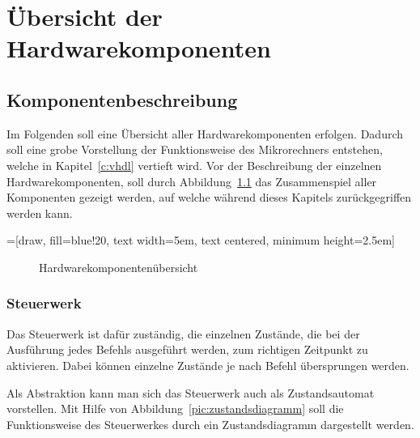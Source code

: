 \chapter{Übersicht der Hardwarekomponenten}
\label{c:hardware}
\section{Komponentenbeschreibung}
Im Folgenden soll eine Übersicht aller Hardwarekomponenten erfolgen. Dadurch
soll eine grobe Vorstellung der Funktionsweise des Mikrorechners entstehen,
welche in Kapitel~\ref{c:vhdl} vertieft wird. Vor der Beschreibung der einzelnen
Hardwarekomponenten, soll durch Abbildung~\ref{pic:hardware_overview} das
Zusammenspiel aller Komponenten gezeigt werden, auf welche während dieses
Kapitels zurückgegriffen werden kann.


=[draw, fill=blue!20, text width=5em, 
    text centered, minimum height=2.5em]

\begin{figure}[htb]
\centering
\begin{tikzpicture}[auto, node distance=3cm,>=latex']
\end{tikzpicture}
\caption{Hardwarekomponentenübersicht}
\label{pic:hardware_overview}
\end{figure}
\pagebreak
\subsection{Steuerwerk}
\label{s:control}
Das Steuerwerk ist dafür zuständig, die einzelnen Zustände, die bei der
Ausführung jedes Befehls ausgeführt werden, zum richtigen Zeitpunkt zu
aktivieren. Dabei können einzelne Zustände je nach Befehl übersprungen werden.

Als Abstraktion kann man sich das Steuerwerk auch als Zustandsautomat
vorstellen. Mit Hilfe von Abbildung~\ref{pic:zustandsdiagramm} soll die
Funktionsweise des Steuerwerkes durch ein Zustandsdiagramm dargestellt werden.

